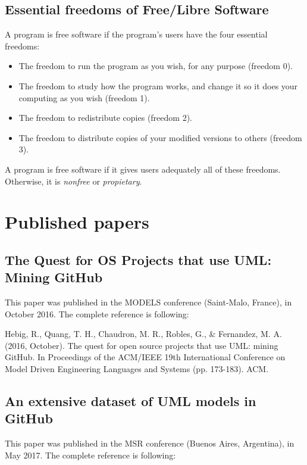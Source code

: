 \documentclass[a4paper, 12pt]{book}
\begin{document}
\section{Essential freedoms of Free/Libre Software}
\label{sec:freedoms}
A program is free software if the program's users have the four essential freedoms:
\begin{itemize}
   \item The freedom to run the program as you wish, for any purpose (freedom 0).
   \item The freedom to study how the program works, and change it so it does your computing as you wish (freedom 1).
   \item The freedom to redistribute copies (freedom 2).
   \item The freedom to distribute copies of your modified versions to others (freedom 3).
\end{itemize}
A program is free software if it gives users adequately all of these freedoms. Otherwise, it is \textit{nonfree} or \textit{propietary}.
\chapter{Published papers}
\label{app:papers}
\section{The Quest for OS Projects that use UML: Mining GitHub}
\label{sec:paper-models}
This paper was published in the MODELS conference (Saint-Malo, France), in October 2016.  The complete reference is following:

Hebig, R., Quang, T. H., Chaudron, M. R., Robles, G., \& Fernandez, M. A. (2016, October). The quest for open source projects that use UML: mining GitHub. In Proceedings of the ACM/IEEE 19th International Conference on Model Driven Engineering Languages and Systems (pp. 173-183). ACM.



\section{An extensive dataset of UML models in GitHub}
\label{sec:paper-msr}
This paper was published in the MSR conference (Buenos Aires, Argentina), in May 2017. The complete reference is following:
\end{document}
